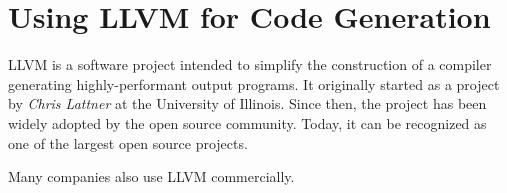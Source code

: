 \section{Using LLVM for Code Generation}

LLVM is a software project intended to simplify the construction of a compiler generating highly-performant output programs.
It originally started as a project by \emph{Chris Lattner} at the University of Illinois.
Since then, the project has been widely adopted by the open source community.
Today, it can be recognized as one of the largest open source projects.


Many companies also use LLVM commercially.


\cite[preface]{Cardoso_Lopes2014-jt}
